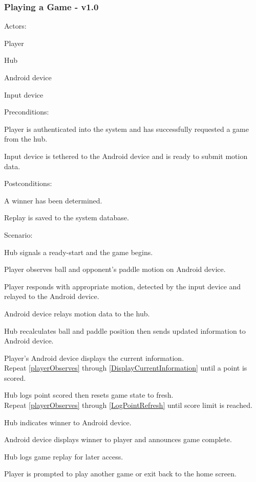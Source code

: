 \documentclass[12pt]{article}
\newenvironment{itemize*}%
  {\begin{itemize}%
  	\setlength{\parsep}{0pt}
    \setlength{\itemsep}{0pt}%
    \setlength{\parskip}{0pt}}%
  {\end{itemize}}
\newenvironment{enumerate*}%
  {\begin{enumerate}%
  	\setlength{\parsep}{0pt}
    \setlength{\itemsep}{0pt}%
    \setlength{\parskip}{0pt}}%
  {\end{enumerate}}
\begin{document}
\subsubsection{Playing a Game - v1.0}
Actors:
\begin{itemize*}
\item Player
\item Hub
\item Android device
\item Input device
\end{itemize*}
Preconditions:
\begin{itemize*}
\item Player is authenticated into the system and has successfully 
  requested a game from the hub.
\item Input device is tethered to the Android device and is ready to 
  submit motion data.
\end{itemize*}
Postconditions:
\begin{itemize*}
\item A winner has been determined.
\item Replay is saved to the system database.
\end{itemize*}
Scenario:
\begin{enumerate*}
\item Hub signals a ready-start and the game begins. 
\item \label{playerObserves}Player observes ball and opponent's paddle 
  motion on Android device.
\item Player responds with appropriate motion, detected by the input 
  device and relayed to the Android device.
\item Android device relays motion data to the hub.
\item \label{HubUpdateGame}Hub recalculates ball and paddle position then 
  sends updated information to Android device.
\item \label{DisplayCurrentInformation}Player's Android device displays 
  the current information.\\
Repeat \ref{playerObserves} through \ref{DisplayCurrentInformation} until 
  a point is scored.
\item \label{LogPointRefresh}Hub logs point scored then resets game state 
  to fresh.\\
Repeat \ref{playerObserves} through \ref{LogPointRefresh} until score limit 
  is reached.
\item \label{AnnounceWinner}Hub indicates winner to Android device.
\item Android device displays winner to player and announces game complete.
\item Hub logs game replay for later access.
\item Player is prompted to play another game or exit back to the home screen.
\end{enumerate*}
\end{document}
